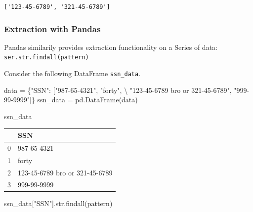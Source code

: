 \documentclass[
  letterpaper,
  DIV=11,
  numbers=noendperiod]{scrreprt}
\newenvironment{Shaded}{\begin{snugshade}}{\end{snugshade}}
\newcommand{\BuiltInTok}[1]{\textcolor[rgb]{0.00,0.23,0.31}{#1}}
\newcommand{\NormalTok}[1]{\textcolor[rgb]{0.00,0.23,0.31}{#1}}
\newcommand{\OperatorTok}[1]{\textcolor[rgb]{0.37,0.37,0.37}{#1}}
\newcommand{\StringTok}[1]{\textcolor[rgb]{0.13,0.47,0.30}{#1}}
\begin{document}
\begin{verbatim}
['123-45-6789', '321-45-6789']
\end{verbatim}

\hypertarget{extraction-with-pandas}{%
\subsubsection{Extraction with Pandas}\label{extraction-with-pandas}}

Pandas similarily provides extraction functionality on a Series of data:
\texttt{ser.str.findall(pattern)}

Consider the following DataFrame \texttt{ssn\_data}.

\begin{Shaded}
\begin{Highlighting}[]
\NormalTok{data }\OperatorTok{=}\NormalTok{ \{}\StringTok{"SSN"}\NormalTok{: [}\StringTok{"987{-}65{-}4321"}\NormalTok{, }\StringTok{"forty"}\NormalTok{, }\OperatorTok{\textbackslash{}}
                \StringTok{"123{-}45{-}6789 bro or 321{-}45{-}6789"}\NormalTok{,}
               \StringTok{"999{-}99{-}9999"}\NormalTok{]\}}
\NormalTok{ssn\_data }\OperatorTok{=}\NormalTok{ pd.DataFrame(data)}
\end{Highlighting}
\end{Shaded}

\begin{Shaded}
\begin{Highlighting}[]
\NormalTok{ssn\_data}
\end{Highlighting}
\end{Shaded}

\begin{tabular}{ll}
\toprule
{} &                             SSN \\
\midrule
0 &                     987-65-4321 \\
1 &                           forty \\
2 &  123-45-6789 bro or 321-45-6789 \\
3 &                     999-99-9999 \\
\bottomrule
\end{tabular}

\begin{Shaded}
\begin{Highlighting}[]
\NormalTok{ssn\_data[}\StringTok{"SSN"}\NormalTok{].}\BuiltInTok{str}\NormalTok{.findall(pattern)}
\end{Highlighting}
\end{Shaded}
\end{document}
